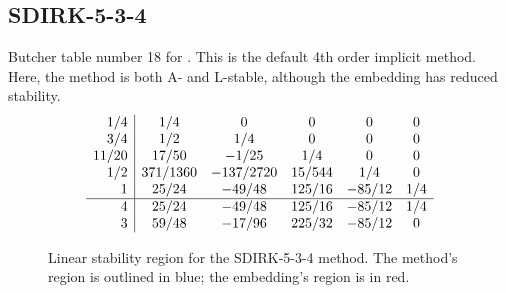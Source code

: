 \documentclass[letterpaper,10pt,english]{sphinxmanual}
\begin{document}
\subsection{SDIRK-5-3-4}
\label{Butcher:butcher-sdirk-5-4}\label{Butcher:sdirk-5-3-4}
Butcher table number 18
for {\hyperref[c_interface/User_callable:ARKodeSetIRKTableNum]{}}.  This is
the default 4th order implicit method.  Here, the method is both A-
and L-stable, although the embedding has reduced stability.
\begin{gather}
\begin{split}\begin{array}{r|ccccc}
  1/4 & 1/4 & 0 & 0 & 0 & 0 \\
  3/4 & 1/2 & 1/4 & 0 & 0 & 0 \\
  11/20 & 17/50 & -1/25 & 1/4 & 0 & 0 \\
  1/2 & 371/1360 & -137/2720 & 15/544 & 1/4 & 0 \\
  1 & 25/24 & -49/48 & 125/16 & -85/12 & 1/4 \\
  \hline
  4 & 25/24 & -49/48 & 125/16 & -85/12 & 1/4 \\
  3 & 59/48 & -17/96 & 225/32 & -85/12 & 0
\end{array}\end{split}\notag
\end{gather}\begin{figure}[htbp]
\centering
\capstart

\caption{Linear stability region for the SDIRK-5-3-4 method.  The method's
region is outlined in blue; the embedding's region is in red.}\end{figure}
\end{document}
